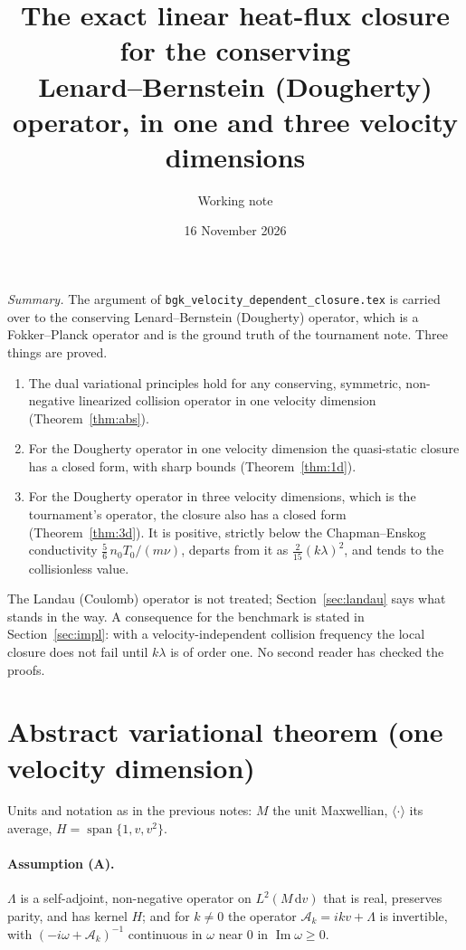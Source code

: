 \documentclass[11pt]{article}
\title{The exact linear heat-flux closure for the conserving\\
Lenard--Bernstein (Dougherty) operator, in one and three velocity dimensions}
\author{Working note}
\date{16 November 2026}
\newcommand{\dd}{\mathrm{d}}
\newcommand{\cA}{\mathcal{A}}
\newcommand{\avg}[1]{\langle #1\rangle}
\renewcommand{\Im}{\operatorname{Im}}
\theoremstyle{remark}
\begin{document}
\maketitle

\noindent\emph{Summary.} The argument of
\texttt{bgk\_velocity\_dependent\_closure.tex} is carried over to the
conserving Lenard--Bernstein (Dougherty) operator, which is a Fokker--Planck
operator and is the ground truth of the tournament note. Three things are
proved.
\begin{enumerate}
  \item The dual variational principles hold for any conserving, symmetric,
    non-negative linearized collision operator in one velocity dimension
    (Theorem~\ref{thm:abs}).
  \item For the Dougherty operator in one velocity dimension the
    quasi-static closure has a closed form, with sharp bounds
    (Theorem~\ref{thm:1d}).
  \item For the Dougherty operator in three velocity dimensions, which is
    the tournament's operator, the closure also has a closed form
    (Theorem~\ref{thm:3d}). It is positive, strictly below the
    Chapman--Enskog conductivity $\tfrac56\,n_0T_0/(m\nu)$, departs from it
    as $\tfrac{2}{15}(k\lambda)^2$, and tends to the collisionless value.
\end{enumerate}
The Landau (Coulomb) operator is not treated; Section~\ref{sec:landau} says
what stands in the way. A consequence for the benchmark is stated in
Section~\ref{sec:impl}: with a velocity-independent collision frequency the
local closure does not fail until $k\lambda$ is of order one. No second
reader has checked the proofs.

\section{Abstract variational theorem (one velocity dimension)}

Units and notation as in the previous notes: $M$ the unit Maxwellian,
$\avg{\cdot}$ its average, $H = \operatorname{span}\{1,v,v^2\}$.

\paragraph{Assumption (A).} $\Lambda$ is a self-adjoint, non-negative
operator on $L^2(M\,\dd v)$ that is real, preserves parity, and has kernel
$H$; and for $k\ne0$ the operator $\cA_k = ikv+\Lambda$ is invertible, with
$(-i\omega+\cA_k)^{-1}$ continuous in $\omega$ near $0$ in $\Im\omega\ge0$.
\end{document}
